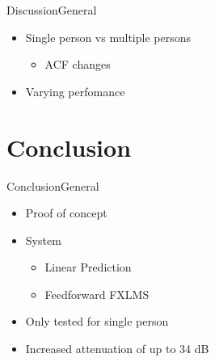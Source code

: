 

	













\begin{frame}{Discussion}{General}		
\begin{itemize}
	\item Single person vs multiple persons
	\begin{itemize}
		\item ACF changes 
	\end{itemize}
	\item Varying perfomance
\end{itemize}
\end{frame}

\section{Conclusion}
\begin{frame}{Conclusion}{General}		
\begin{itemize}
	\item Proof of concept
	\item System
	\begin{itemize}
		\item Linear Prediction
		\item Feedforward FXLMS
	\end{itemize}
	\item Only tested for single person
	\item Increased attenuation of up to 34 dB
\end{itemize}
\end{frame}

